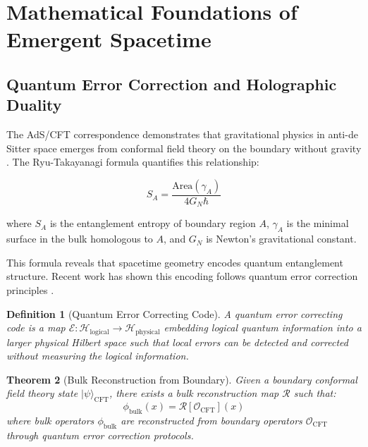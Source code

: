 \documentclass[12pt,a4paper]{article}
\newtheorem{theorem}{Theorem}[section]
\newtheorem{definition}[theorem]{Definition}
\theoremstyle{remark}
\newcommand{\Hil}{\mathcal{H}}
\begin{document}
\section{Mathematical Foundations of Emergent Spacetime}
\label{sec:foundations}

\subsection{Quantum Error Correction and Holographic Duality}

The AdS/CFT correspondence demonstrates that gravitational physics in anti-de Sitter space emerges from conformal field theory on the boundary without gravity \cite{Maldacena1998}. The Ryu-Takayanagi formula quantifies this relationship:

\begin{equation}
S_A = \frac{\text{Area}(\gamma_A)}{4G_N\hbar}
\label{eq:RT}
\end{equation}

where $S_A$ is the entanglement entropy of boundary region $A$, $\gamma_A$ is the minimal surface in the bulk homologous to $A$, and $G_N$ is Newton's gravitational constant.

This formula reveals that spacetime geometry encodes quantum entanglement structure. Recent work has shown this encoding follows quantum error correction principles \cite{Almheiri2015, Pastawski2015}.

\begin{definition}[Quantum Error Correcting Code]
A quantum error correcting code is a map $\mathcal{E}: \Hil_{\text{logical}} \to \Hil_{\text{physical}}$ embedding logical quantum information into a larger physical Hilbert space such that local errors can be detected and corrected without measuring the logical information.
\end{definition}

\begin{theorem}[Bulk Reconstruction from Boundary]
\label{thm:bulk_reconstruction}
Given a boundary conformal field theory state $|\psi\rangle_{\text{CFT}}$, there exists a bulk reconstruction map $\mathcal{R}$ such that:
\begin{equation}
\phi_{\text{bulk}}(x) = \mathcal{R}[\mathcal{O}_{\text{CFT}}](x)
\end{equation}
where bulk operators $\phi_{\text{bulk}}$ are reconstructed from boundary operators $\mathcal{O}_{\text{CFT}}$ through quantum error correction protocols.
\end{theorem}
\end{document}
